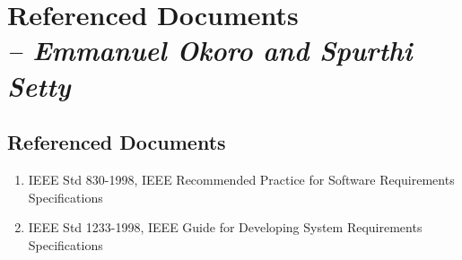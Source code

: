 \chapter{Referenced Documents \\
\small{\textit{-- Emmanuel Okoro and Spurthi Setty }}
\label{Chapter::ReferencedDocuments}}

\section{ Referenced Documents}
\begin{enumerate}
    \item IEEE Std 830-1998, IEEE Recommended Practice for Software Requirements Specifications
    \item IEEE Std 1233-1998, IEEE Guide for Developing System Requirements Specifications
\end{enumerate}